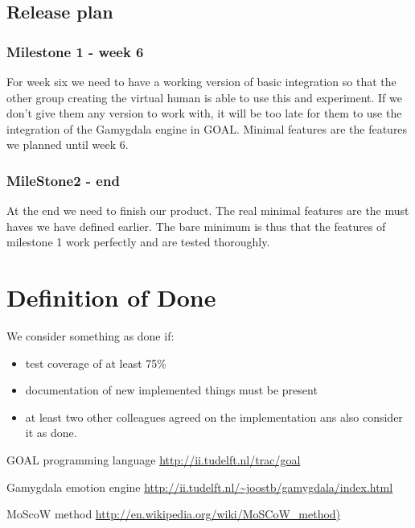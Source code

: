 \documentclass[]{article}
\begin{document}
\subsection{Release plan}
\subsubsection{Milestone 1 - week 6}
For week six we need to have a working version of basic integration so that the other group creating the virtual human is able to use this and experiment. If we don't give them any version to work with, it will be too late for them to use the integration of the Gamygdala engine in GOAL. Minimal features are the features we planned until week 6.
\subsubsection{MileStone2 - end}
At the end we need to finish our product. The real minimal features are the must haves we have defined earlier. The bare minimum is thus that the features of milestone 1 work perfectly and are tested thoroughly.
\pagebreak
\section{Definition of Done}
We consider something as done if:
\begin{itemize}
	\item test coverage of at least 75\%
	\item documentation of new implemented things must be present
	\item at least two other colleagues agreed on the implementation ans also consider it as done.
\end{itemize}

\clearpage
\printglossaries


\begin{thebibliography}{9}
	
	GOAL programming language
	\url{http://ii.tudelft.nl/trac/goal}
	
	Gamygdala emotion engine
	\url{http://ii.tudelft.nl/~joostb/gamygdala/index.html}
	
	MoScoW method
	\url{http://en.wikipedia.org/wiki/MoSCoW_method) }
	
	
\end{thebibliography}
\end{document}
